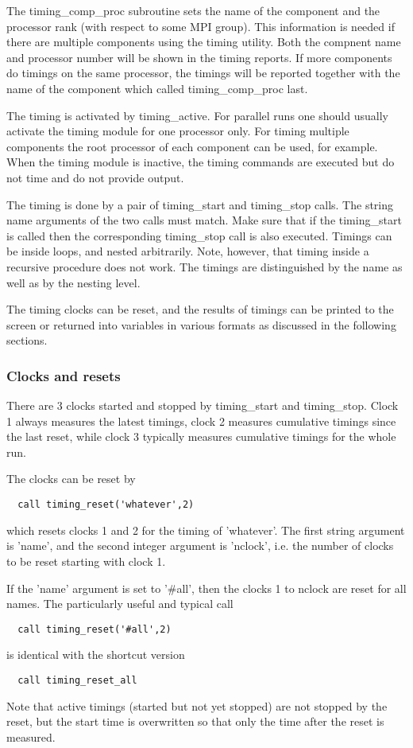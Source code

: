 The timing\_comp\_proc subroutine sets the name of the component and
the processor rank (with respect to some MPI group). This
information is needed if there are multiple components using the
timing utility. Both the compnent name and processor number will be
shown in the timing reports. If more components do timings on the same 
processor, the timings will be reported together with the name
of the component which called timing\_comp\_proc last.

The timing is activated by timing\_active. For parallel runs
one should usually activate the timing module for one processor only.
For timing multiple components the root processor of each component
can be used, for example.
When the timing module is inactive, the timing commands are executed 
but do not time and do not provide output.

The timing is done by a pair of timing\_start and timing\_stop calls.
The string name arguments of the two calls must match. 
Make sure that if the timing\_start is called then the corresponding
timing\_stop call is also executed. 
Timings can be inside loops, and nested arbitrarily. 
Note, however, that timing inside a recursive procedure does not work.
The timings are distinguished by the name as well as by the nesting level.

The timing clocks can be reset, and the results of timings can be printed 
to the screen or returned into variables in various formats as discussed 
in the following sections. 

\subsubsection{Clocks and resets}

There are 3 clocks started and stopped by timing\_start
and timing\_stop. Clock 1 always measures the latest timings,
clock 2 measures cumulative timings since the last reset,
while clock 3 typically measures cumulative timings for the whole run.

The clocks can be reset by
\begin{verbatim}
  call timing_reset('whatever',2)
\end{verbatim}
which resets clocks 1 and 2 for the timing of 'whatever'. 
The first string argument is 'name', and the second integer
argument is 'nclock', i.e. the number of clocks to be reset
starting with clock 1.

If the 'name' argument is set to '\#all', 
then the clocks 1 to nclock are reset for all names.
The particularly useful and typical call 
\begin{verbatim}
  call timing_reset('#all',2)
\end{verbatim}
is identical with the shortcut version
\begin{verbatim}
  call timing_reset_all
\end{verbatim}
Note that active timings (started but not yet stopped) are not stopped 
by the reset, but the start time is overwritten
so that only the time after the reset is measured.

